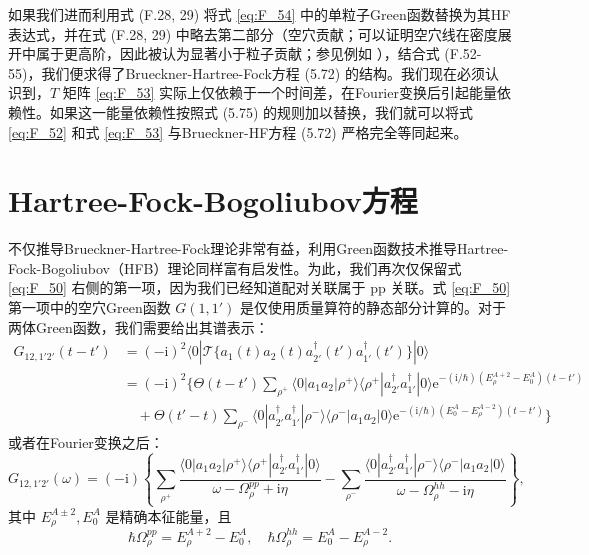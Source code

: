 如果我们进而利用式 (F.28, 29) 将式 \ref{eq:F_54} 中的单粒子Green函数替换为其HF表达式，并在式 (F.28,
29) 中略去第二部分（空穴贡献；可以证明空穴线在密度展开中属于更高阶，因此被认为显著小于粒子贡献；参见例如 \cite{Ma67b}），结合式
(F.52-55)，我们便求得了Brueckner-Hartree-Fock方程 (5.72) 的结构。我们现在必须认识到，$T$
矩阵 \ref{eq:F_53} 实际上仅依赖于一个时间差，在Fourier变换后引起能量依赖性。如果这一能量依赖性按照式 (5.75)
的规则加以替换，我们就可以将式 \ref{eq:F_52} 和式 \ref{eq:F_53} 与Brueckner-HF方程 (5.72)
严格完全等同起来。

\section{Hartree-Fock-Bogoliubov方程}

不仅推导Brueckner-Hartree-Fock理论非常有益，利用Green函数技术推导Hartree-Fock-Bogoliubov（HFB）理论同样富有启发性。为此，我们再次仅保留式
\ref{eq:F_50} 右侧的第一项，因为我们已经知道配对关联属于 pp 关联。式 \ref{eq:F_50} 第一项中的空穴Green函数
$G(1,1')$ 是仅使用质量算符的静态部分计算的。对于两体Green函数，我们需要给出其谱表示：
\begin{align}
G_{12,1'2'}(t-t') & =(-\mathrm{i})^{2}\langle0|\mathcal{T}\{a_{1}(t)a_{2}(t)a^{\dagger}_{2'}(t')a^{\dagger}_{1'}(t')\}|0\rangle\nonumber \\
 & =(-\mathrm{i})^{2}\Big\{\Theta(t-t')\sum_{\rho^{+}}\langle0|a_{1}a_{2}|\rho^{+}\rangle\langle\rho^{+}|a^{\dagger}_{2'}a^{\dagger}_{1'}|0\rangle\mathrm{e}^{-(\mathrm{i}/\hbar)(E^{A+2}_{\rho}-E^{A}_{0})(t-t')}\nonumber \\
 & \quad+\Theta(t'-t)\sum_{\rho^{-}}\langle0|a^{\dagger}_{2'}a^{\dagger}_{1'}|\rho^{-}\rangle\langle\rho^{-}|a_{1}a_{2}|0\rangle\mathrm{e}^{-(\mathrm{i}/\hbar)(E^{A}_{0}-E^{A-2}_{\rho})(t-t')}\Big\}\label{eq:F_56}
\end{align}
或者在Fourier变换之后：
\begin{equation}
G_{12,1'2'}(\omega)=(-\mathrm{i})\left\{ \sum_{\rho^{+}}\frac{\langle0|a_{1}a_{2}|\rho^{+}\rangle\langle\rho^{+}|a^{\dagger}_{2'}a^{\dagger}_{1'}|0\rangle}{\omega-\Omega^{pp}_{\rho}+\mathrm{i}\eta}-\sum_{\rho^{-}}\frac{\langle0|a^{\dagger}_{2'}a^{\dagger}_{1'}|\rho^{-}\rangle\langle\rho^{-}|a_{1}a_{2}|0\rangle}{\omega-\Omega^{hh}_{\rho}-\mathrm{i}\eta}\right\} ,\label{eq:F_57}
\end{equation}
其中 $E^{A\pm2}_{\rho},E^{A}_{0}$ 是精确本征能量，且
\[
\hbar\Omega^{pp}_{\rho}=E^{A+2}_{\rho}-E^{A}_{0},\quad\hbar\Omega^{hh}_{\rho}=E^{A}_{0}-E^{A-2}_{\rho}.
\]

